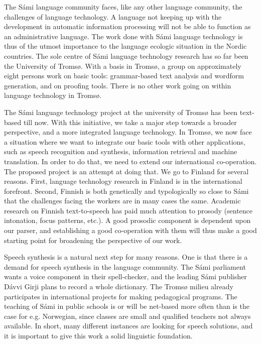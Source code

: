 \documentclass[a4paper,english]{article}
\begin{document}
The Sámi language community faces, like any other language community, the challenges of language technology. A language not keeping up with the development in automatic information processing will not be able to function as an administrative language. The work done with Sámi language technology is thus of the utmost importance to the language ecologic situation in the Nordic countries. The sole centre of Sámi language technology research has so far been the University of Tromsø.  With a basis in Tromsø, a group on approximately eight persons work on basic tools: grammar-based text analysis and wordform generation, and on proofing tools. There is no other work going on within language technology in Tromsø.

The Sámi language technology project at the university of Tromsø has been text-based till now. With this initiative, we take a major step towards a broader perspective, and a more integrated language technology. In Tromsø, we now face a situation where we want to integrate our basic tools with other applications, such as speech recognition and synthesis, information retrieval and machine translation. In order to do that, we need to extend our international co-operation. The proposed project is an attempt at doing that. We go to Finland for several reasons. First, language technology research in Finland is in the international forefront. Second, Finnish is both genetically and typologically so close to Sámi that the challenges facing the workers are in many cases the same. Academic research on Finnish text-to-speech has paid much attention to prosody (sentence intonation, focus patterns, etc.).  A good prosodic component is dependent upon our parser, and establishing a good co-operation with them will thus make a good starting point for broadening the perspective of our work.

Speech synthesis is a natural next step for many reasons. One is that there is a demand for speech synthesis in the language community. The Sámi parliament wants a voice component in their spell-checker, and the leading Sámi publisher Dávvi Girji plans to record a whole dictionary. The Tromsø milieu already participates in international projects for making pedagogical programs. The teaching of Sámi in public schools is or will be net-based more often than is the case for e.g. Norwegian, since classes are small and qualified teachers not always available. In short, many different instances are looking for speech solutions, and it is important to give this work a solid linguistic foundation.
\end{document}
